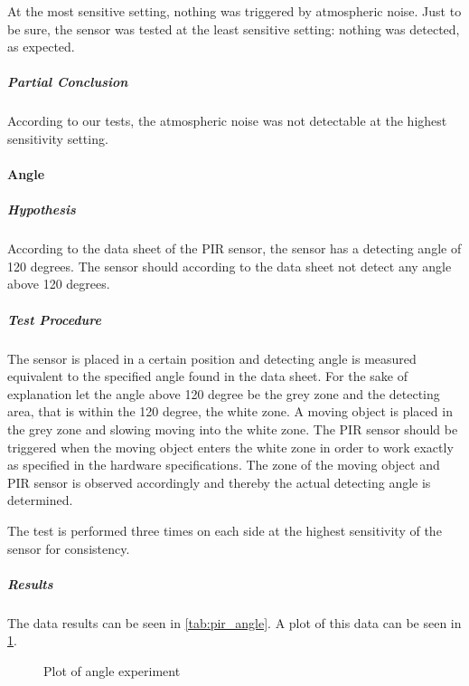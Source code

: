 At the most sensitive setting, nothing was triggered by atmospheric noise. Just
to be sure, the sensor was tested at the least sensitive setting: nothing was
detected, as expected.

\subparagraph{Partial Conclusion}
\label{subp:SenPartial Conclusion}

According to our tests, the atmospheric noise was not detectable at the highest
sensitivity setting.

\paragraph{Angle}
\label{par:Angle}

\subparagraph{Hypothesis}
\label{subp:AngHypothesis}
According to the data sheet of the PIR sensor,
the sensor has a detecting angle of 120 degrees.
The sensor should according to the data sheet not detect any angle above 120 degrees.

\subparagraph{Test Procedure}
\label{subp:AngTest Procedure}
The sensor is placed in a certain position and detecting angle is measured equivalent to
the specified angle found in the data sheet.
For the sake of explanation let the angle above 120 degree be the grey zone and
the detecting area, that is within the 120 degree, the white zone.
A moving object is placed in the grey zone and slowing moving into the white zone.
The PIR sensor should be triggered when the moving object enters the white zone in order
to work exactly as specified in the hardware specifications.
The zone of the moving object and PIR sensor is observed accordingly
and thereby the actual detecting angle is determined.

The test is performed three times on each side at the highest sensitivity of the sensor for consistency.

\subparagraph{Results}
\label{subp:AngResults}

The data results can be seen in \cref{tab:pir_angle}. A plot of this data can be
seen in \cref{fig:pir_angle}.

\begin{figure}[htbp]
\centering
{}
\caption[Angle experiment]{Plot of angle experiment}\label{fig:pir_angle}
\end{figure}

